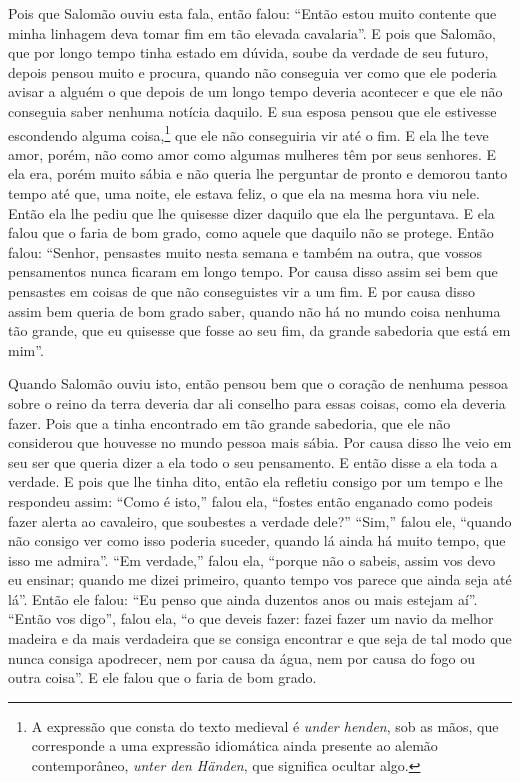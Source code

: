 Pois que Salomão ouviu esta fala, então falou: “Então estou muito contente que
minha linhagem deva tomar fim em tão elevada cavalaria”. E pois que
Salomão, que por longo tempo tinha estado em dúvida, soube da verdade de seu
futuro, depois pensou muito e procura, quando não conseguia ver como que ele
poderia avisar a alguém o que depois de um longo tempo deveria acontecer e que
ele não conseguia saber nenhuma notícia daquilo. E sua esposa pensou que ele
estivesse escondendo alguma coisa,\footnote{ A expressão que consta do texto
medieval é \textit{under henden}, sob as mãos, que corresponde a uma expressão
idiomática ainda presente ao alemão contemporâneo, \textit{unter den Händen},
que significa ocultar algo.}  que ele não conseguiria vir até o
fim. E ela lhe teve amor, porém, não como amor como algumas mulheres têm por
seus senhores. E ela era, porém muito sábia e não queria lhe perguntar de
pronto e demorou tanto tempo até que, uma noite, ele estava feliz, o que ela na
mesma hora viu nele. Então ela lhe pediu que lhe quisesse dizer daquilo que ela
lhe perguntava. E ela falou que o faria de bom grado, como aquele que daquilo
não se protege. Então falou: “Senhor, pensastes muito nesta semana e também na
outra, que vossos pensamentos nunca ficaram em longo tempo. Por causa disso
assim sei bem que pensastes em coisas de que não conseguistes vir a um fim. E
por causa disso assim bem queria de bom grado saber, quando não há no mundo
coisa nenhuma tão grande, que eu quisesse que fosse ao seu fim, da grande
sabedoria que está em mim”. 

 Quando Salomão ouviu isto, então pensou bem que o coração de nenhuma pessoa
sobre o reino da terra deveria dar ali conselho para essas coisas, como ela
deveria fazer. Pois que a tinha encontrado em tão grande sabedoria, que ele não
considerou que houvesse no mundo pessoa mais sábia. Por causa disso lhe veio em
seu ser que queria dizer a ela todo o seu pensamento. E então disse a ela toda
a verdade. E pois que lhe tinha dito, então ela refletiu consigo por um tempo e
lhe respondeu assim: “Como é isto,” falou ela, “fostes então enganado como
podeis fazer alerta ao cavaleiro, que soubestes a verdade dele?” “Sim,” falou
ele, “quando não consigo ver como isso poderia suceder, quando lá ainda há
muito tempo, que isso me admira”. “Em verdade,” falou ela, “porque não o
sabeis, assim vos devo eu ensinar; quando me dizei primeiro, quanto tempo vos
parece que ainda seja até lá”. Então ele falou: “Eu penso que ainda duzentos
anos ou mais estejam aí”. “Então vos digo”, falou ela, “o que deveis fazer:
fazei fazer um navio da melhor madeira e da mais verdadeira que se consiga
encontrar e que seja de tal modo que nunca consiga apodrecer, nem por causa da
água, nem por causa do fogo ou outra coisa”. E ele falou que o faria de bom
grado. 

